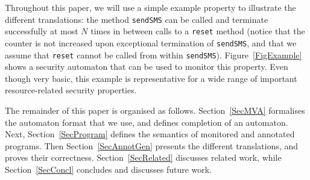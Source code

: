 Throughout this paper, we will use a simple example property to
illustrate the different translations: the method \texttt{sendSMS} can
be called and terminate successfully at most \(N\) times in between
calls to a \texttt{reset} method (notice that the counter is not
increased upon exceptional termination of
\texttt{sendSMS}, and that we assume that \texttt{reset} cannot be
called from within \texttt{sendSMS}). Figure~\ref{FigExample} shows a
security automaton that can be used to monitor this property. Even
though very basic, this example is representative for a wide range of
important resource-related security properties.



The remainder of this paper is organised as
follows. Section~\ref{SecMVA} formalises the automaton format that we
use, and defines completion of an automaton. Next,
Section~\ref{SecProgram} defines the semantics of monitored and
annotated programs. Then Section~\ref{SecAnnotGen} presents the
different translations, and proves their
correctness. Section~\ref{SecRelated} discusses related work, while
Section~\ref{SecConcl} concludes and discusses future work.

